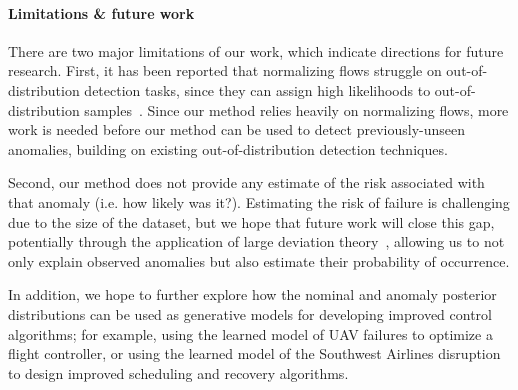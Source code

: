 \paragraph{Limitations \& future work} There are two major limitations of our work, which indicate directions for future research. First, it has been reported that normalizing flows struggle on out-of-distribution detection tasks, since they can assign high likelihoods to out-of-distribution samples~\cite{kirichenkoWhyNormalizingFlows2020}. Since our method relies heavily on normalizing flows, more work is needed before our method can be used to detect previously-unseen anomalies, building on existing out-of-distribution detection techniques.

Second, our method does not provide any estimate of the risk associated with that anomaly (i.e. how likely was it?). Estimating the risk of failure is challenging due to the size of the dataset, but we hope that future work will close this gap, potentially through the application of large deviation theory~\cite{demboLargeDeviationsTechniques2010}, allowing us to not only explain observed anomalies but also estimate their probability of occurrence.

In addition, we hope to further explore how the nominal and anomaly posterior distributions can be used as generative models for developing improved control algorithms; for example, using the learned model of UAV failures to optimize a flight controller, or using the learned model of the Southwest Airlines disruption to design improved scheduling and recovery algorithms.